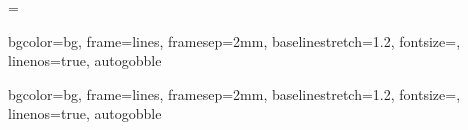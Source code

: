 \newenvironment{preface}{
    \begin{center}
    \textbf{Préface}
    \par
    \vspace{0.5cm}
    \begin{minipage}{0.8\linewidth}}{\end{minipage}
    \noindent\ignorespaces
    \end{center}
}

\usepackage[newfloat]{minted}       %

\newenvironment{code}{\captionsetup{type=listing}}{}

\newenvironment{longlisting}{\captionsetup{type=listing}}{} %
\vbadness=\maxdimen    %

\setminted          %
{
bgcolor=bg,
frame=lines,
framesep=2mm,
baselinestretch=1.2,
fontsize=\footnotesize,
linenos=true,
autogobble
}

\setmintedinline    %
{
bgcolor=bg,
frame=lines,
framesep=2mm,
baselinestretch=1.2,
fontsize=\footnotesize,
linenos=true,
autogobble
}

